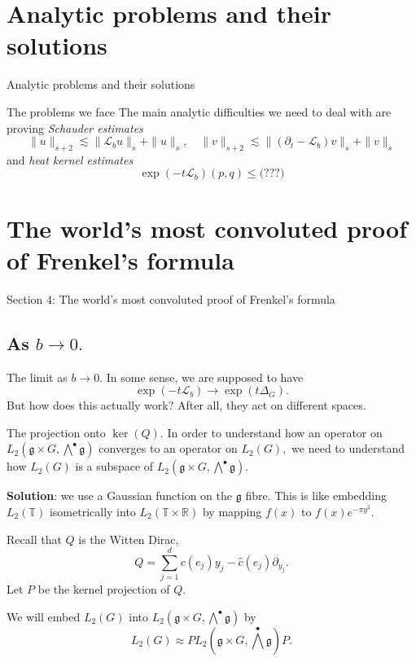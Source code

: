 \documentclass{beamer}
\numberwithin{equation}{section}
\theoremstyle{plain}
\theoremstyle{plain}
\theoremstyle{definition}
\theoremstyle{plain}
\theoremstyle{plain}
\theoremstyle{definition}
\newcommand{\Rl}{\mathbb{R}}
\newcommand{\Circ}{\mathbb{T}}
\newcommand{\Lc}{\mathcal{L}}
\newcommand{\gf}{\mathfrak{g}}
\begin{document}
\section{Analytic problems and their solutions}

\begin{frame}
  \huge{Analytic problems and their solutions}
\end{frame}

\begin{frame}{The problems we face}
  The main analytic difficulties we need to deal with are proving \emph{Schauder estimates}
  \[
    \|u\|_{s+2} \lesssim \|\Lc_bu\|_s+\|u\|_s,\quad \|v\|_{s+2} \lesssim \|(\partial_t-\Lc_b)v\|_s+\|v\|_s
  \]
  and \emph{heat kernel estimates}
  \[
    \exp(-t\Lc_b)(p,q) \leq \text{(???)}
  \]
\end{frame}


\section{The world's most convoluted proof of Frenkel's formula}

\begin{frame}
  \huge{Section 4: The world's most convoluted proof of Frenkel's formula}
\end{frame}

\subsection{As $b\to 0.$}

\begin{frame}{The limit as $b\to 0.$}
    In some sense, we are supposed to have
    \[
      \exp(-t\Lc_b)\rightarrow \exp(t\Delta_G).
    \]
    But how does this actually work? After all, they act on different spaces.
\end{frame}

\begin{frame}{The projection onto $\ker(Q).$}
  In order to understand how an operator on $L_2(\gf\times G,\bigwedge^{\bullet}\gf)$ converges to an operator on
  $L_2(G),$ we need to understand how $L_2(G)$ is a subspace of $L_2(\gf\times G,\bigwedge^{\bullet}\gf).$
  
  \textbf{Solution}: we use a Gaussian function on the $\gf$ fibre. 
  This is like embedding $L_2(\Circ)$ isometrically into $L_2(\Circ\times \Rl)$ by mapping $f(x)$ to $f(x)e^{-\pi y^2}.$
  
  \begin{definition}
    Recall that $Q$ is the Witten Dirac,
    \[
      Q = \sum_{j=1}^d c(e_j)y_j - \widehat{c}(e_j)\partial_{y_j}.
    \]
    Let $P$ be the kernel projection of $Q.$
  \end{definition}
  We will embed $L_2(G)$ into $L_2(\gf\times G,\bigwedge^{\bullet}\gf)$ by
  \[
    L_2(G)\approx  PL_2(\gf\times G,\bigwedge^{\bullet}\gf)P.
  \]
\end{frame}
\end{document}
